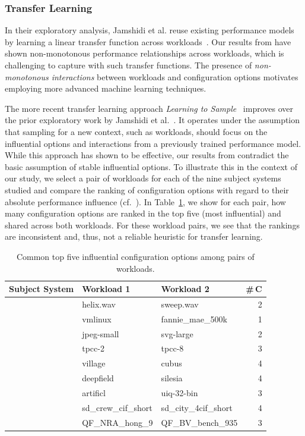 {{{\subsubsection{Transfer Learning} In their exploratory analysis, Jamshidi et al. reuse existing performance models by learning a linear transfer function across workloads~\cite{jamishidi_transfer_2017}. Our results from  have shown non-monotonous performance relationships across workloads, which is challenging to capture with such transfer functions. The presence of \textit{non-monotonous interactions} between workloads and configuration options motivates employing more advanced machine learning techniques. 

The more recent transfer learning approach \emph{Learning to Sample}~\cite{jamshidi_learning_2018} improves over the prior exploratory work by Jamshidi et al.~\cite{jamishidi_transfer_2017}. It operates under the assumption that sampling for a new context, such as workloads, should focus on the influential options and interactions from a previously trained performance model. While this approach has shown to be effective, our results from  contradict the basic assumption of stable influential options. 
To illustrate this in the context of our study, we select a pair of workloads for each of the nine subject systems studied and compare the ranking of configuration options with regard to their absolute performance influence (cf.~). In Table~\ref{tab:shared_options}, we show for each pair, how many configuration options are ranked in the top five (most influential) and shared across both workloads. For these workload pairs, we see that the rankings are inconsistent and, thus, not a reliable heuristic for transfer learning.

\begin{table}
	\centering
	\footnotesize
	\caption{Common top five influential configuration options among pairs of workloads.}
	\begin{tabular}{lllr}
		\toprule
		\textbf{Subject System} & \textbf{Workload 1} & \textbf{Workload 2} & \textbf{\#\,C} \\
		\midrule
		\jumper & helix.wav & sweep.wav & 2\\
		\kanzi & vmlinux & fannie\_mae\_500k & 1\\
		\dconvert & jpeg-small & svg-large & 2\\
		\htwo & tpcc-2 & tpcc-8 & 3\\
		\batik & village & cubus & 4\\
		\midrule
		\xz & deepfield & silesia & 4\\
		\lrzip & artificl & uiq-32-bin & 3\\
		\xzwo & sd\_crew\_cif\_short &sd\_city\_4cif\_short & 4\\
		\zdrei & QF\_NRA\_hong\_9 & QF\_BV\_bench\_935 & 3\\
		\bottomrule
	\end{tabular}
\label{tab:shared_options}


\end{table}}}}
